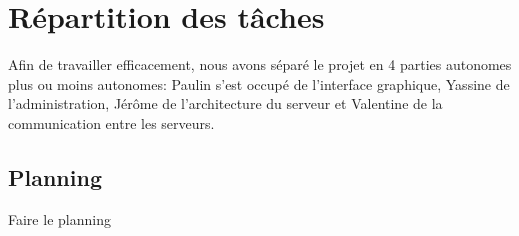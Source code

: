 \section{Répartition des tâches}

\par Afin de travailler efficacement, nous avons séparé le projet en 4 parties autonomes plus ou moins autonomes: Paulin s'est occupé de l'interface graphique, Yassine de l'administration, Jérôme de l'architecture du serveur et Valentine de la communication entre les serveurs.

\subsection{Planning}

Faire le planning
